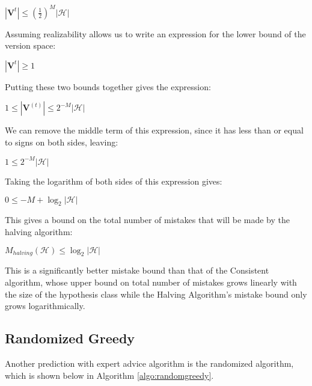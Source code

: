 \documentclass[11pt]{article}
\begin{document}
\begin{center}
    $|\textbf{V}^t| \leq (\frac{1}{2})^M |\mathcal{H}|$
\end{center}

Assuming realizability allows us to write an expression for the lower bound of the version space:

\begin{center}
    $|\textbf{V}^t| \geq 1$
\end{center}

Putting these two bounds together gives the expression:

\begin{center}
    $1 \leq |\textbf{V}^{(t)}| \leq 2^{-M} |\mathcal{H}|$
\end{center}

We can remove the middle term of this expression, since it has less than or equal to signs on both sides, leaving:

\begin{center}
    $1 \leq 2^{-M} |\mathcal{H}|$
\end{center}

Taking the logarithm of both sides of this expression gives:

\begin{center}
    $0 \leq -M + \log_2|\mathcal{H}|$
\end{center}

This gives a bound on the total number of mistakes that will be made by the halving algorithm:

\begin{center}
    $M_{halving}(\mathcal{H}) \leq \log_2 |\mathcal{H}|$
\end{center}

This is a significantly better mistake bound than that of the Consistent algorithm, whose upper bound on total number of mistakes grows linearly with the size of the hypothesis class while the Halving Algorithm's mistake bound only grows logarithmically.

\subsection{Randomized Greedy}

Another prediction with expert advice algorithm is the randomized algorithm, which is shown below in Algorithm \ref{algo:randomgreedy}.
\end{document}
